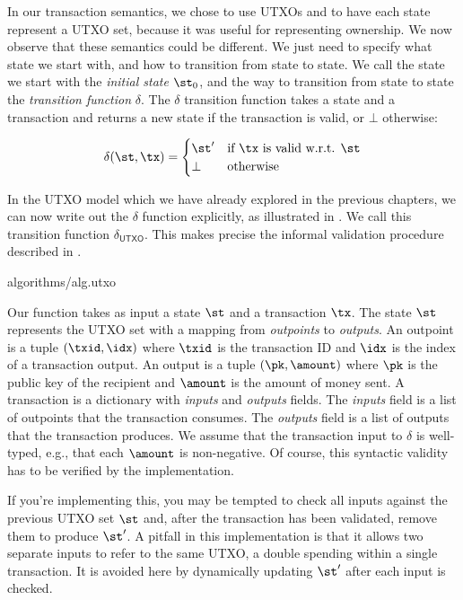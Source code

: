 In our transaction semantics, we chose to use UTXOs and to have each state represent a UTXO set,
because it was useful for representing ownership. We now observe that these semantics could be
different. We just need to specify what state we start with, and how to transition from state to state.
We call the state we start with the \emph{initial state} $\st_0$, and the way to transition from state
to state the \emph{transition function} $\delta$. The $\delta$ transition function takes a state and
a transaction and returns a new state if the transaction is valid, or $\bot$ otherwise:

\[
  \delta(\st, \tx) = \begin{cases}
    \st' & \text{if $\tx$ is valid w.r.t. $\st$} \\
    \bot & \text{otherwise} \\
  \end{cases}
\]

In the UTXO model which we have already explored in the previous chapters, we can now
write out the $\delta$ function explicitly, as illustrated in .
We call this transition function $\delta_{\textsf{UTXO}}$. This makes precise the informal
validation procedure described in .

{algorithms/alg.utxo}

Our function takes as input a state $\st$ and a transaction $\tx$. The state
$\st$ represents the UTXO set with a mapping from \emph{outpoints} to
\emph{outputs}. An outpoint is a tuple $(\txid, \idx)$ where $\txid$ is the
transaction ID and $\idx$ is the index of a transaction output. An output is a
tuple $(\pk, \amount)$ where $\pk$ is the public key of the recipient and
$\amount$ is the amount of money sent. A transaction is a dictionary with
\emph{inputs} and \emph{outputs} fields. The \emph{inputs} field is a list of
outpoints that the transaction consumes. The \emph{outputs} field is a list of
outputs that the transaction produces. We assume that the transaction input to
$\delta$ is well-typed, e.g., that each $\amount$ is non-negative. Of course,
this syntactic validity has to be verified by the implementation.

If you're implementing this, you may be tempted to check all inputs against the
previous UTXO set $\st$ and, after the transaction has been validated, remove
them to produce $\st'$.  A pitfall in this implementation is that it allows two
separate inputs to refer to the same UTXO, a double spending within a single
transaction. It is avoided here by dynamically updating $\st'$ after each input
is checked.

